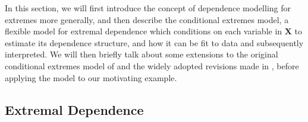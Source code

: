 \documentclass{article}
\numberwithin{equation}{section}
\begin{document}
In this section, we will first introduce the concept of dependence modelling for extremes more generally, and then describe the conditional extremes model, a flexible model for extremal dependence which conditions on each variable in $\bm{X}$ to estimate its dependence structure, and how it can be fit to data and subsequently interpreted.
We will then briefly talk about some extensions to the original conditional extremes model of \citet{Heffernan2004} and the widely adopted revisions made in \citet{Keef2013}, before applying the model to our motivating example.

\subsection{Extremal Dependence}
\end{document}
